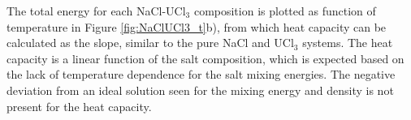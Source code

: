 \documentclass[titlepage=firstiscover,11pt,fleqn,headheight=14pt,footheight=40.8pt]{scrreprt}
\begin{document}
The total energy for each NaCl-UCl$_3$ composition is plotted as function of temperature in Figure \ref{fig:NaClUCl3_t}b), from which heat capacity can be calculated as the slope, similar to the pure NaCl and UCl$_3$ systems. The heat capacity is a linear function of the salt composition, which is expected based on the lack of temperature dependence for the salt mixing energies. The negative deviation from an ideal solution seen for the mixing energy and density is not present for the heat capacity. 


\end{document}
